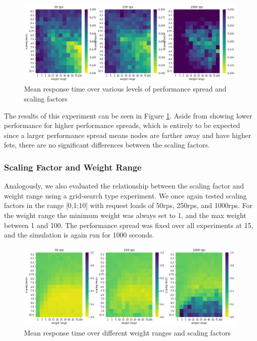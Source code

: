\begin{figure}
    \centering
    \includegraphics[width=14cm]{graphics/graphs/lb_hyper_scaling_vs_performance_spread.png}
    \caption{Mean response time over various levels of performance spread and scaling factors}
    \label{fig:lb_hyper_scaling_perfspread}
\end{figure}

The results of this experiment can be seen in Figure \ref{fig:lb_hyper_scaling_perfspread}.
Aside from showing lower performance for higher performance spreads, which is entirely to be expected since a larger performance spread means nodes are farther away and have higher \glspl{fet}, there are no significant differences between the scaling factors.

\subsubsection{Scaling Factor and Weight Range}
Analogously, we also evaluated the relationship between the scaling factor and weight range using a grid-search type experiment.
We once again tested scaling factors in the range [0,1;10] with request loads of 50\gls{rps}, 250\gls{rps}, and 1000\gls{rps}.
For the weight range the minimum weight was always set to 1, and the max weight between 1 and 100.
The performance spread was fixed over all experiments at 15, and the simulation is again run for 1000 seconds.

\begin{figure}
    \centering
    \includegraphics[width=14cm]{graphics/graphs/lb_hyper_scaling_vs_weight_range.png}
    \caption{Mean response time over different weight ranges and scaling factors}
    \label{fig:lb_hyper_weightrange_scaling}
\end{figure}

